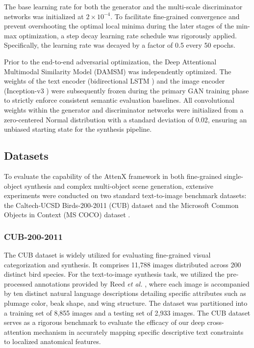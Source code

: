 \documentclass[conference]{IEEEtran}
\begin{document}
The base learning rate for both the generator and the multi-scale discriminator networks was initialized at $2 \times 10^{-4}$. To facilitate fine-grained convergence and prevent overshooting the optimal local minima during the later stages of the min-max optimization, a step decay learning rate schedule was rigorously applied. Specifically, the learning rate was decayed by a factor of 0.5 every 50 epochs.

Prior to the end-to-end adversarial optimization, the Deep Attentional Multimodal Similarity Model (DAMSM) was independently optimized. The weights of the text encoder (bidirectional LSTM \cite{schuster1997bidirectional, hochreiter1997lstm}) and the image encoder (Inception-v3 \cite{szegedy2016rethinking}) were subsequently frozen during the primary GAN training phase to strictly enforce consistent semantic evaluation baselines. All convolutional weights within the generator and discriminator networks were initialized from a zero-centered Normal distribution with a standard deviation of 0.02, ensuring an unbiased starting state for the synthesis pipeline.

\subsection{Datasets}

To evaluate the capability of the AttenX framework in both fine-grained single-object synthesis and complex multi-object scene generation, extensive experiments were conducted on two standard text-to-image benchmark datasets: the Caltech-UCSD Birds-200-2011 (CUB) dataset \cite{wah2011caltech} and the Microsoft Common Objects in Context (MS COCO) dataset \cite{lin2014microsoft}.

\subsubsection{CUB-200-2011}
The CUB dataset \cite{wah2011caltech} is widely utilized for evaluating fine-grained visual categorization and synthesis. It comprises 11,788 images distributed across 200 distinct bird species. For the text-to-image synthesis task, we utilized the pre-processed annotations provided by Reed \textit{et al.} \cite{reed2016learning}, where each image is accompanied by ten distinct natural language descriptions detailing specific attributes such as plumage color, beak shape, and wing structure. The dataset was partitioned into a training set of 8,855 images and a testing set of 2,933 images. The CUB dataset serves as a rigorous benchmark to evaluate the efficacy of our deep cross-attention mechanism in accurately mapping specific descriptive text constraints to localized anatomical features.
\end{document}
